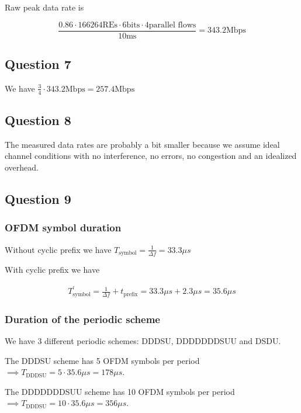 \documentclass[]{article}
\begin{document}
	Raw peak data rate is
	
	\begin{equation}
		\frac{0.86 \cdot 166264 \text{REs} \cdot 6 \text{bits} \cdot 4 \text{parallel flows}}{10 \text{ms}} = 343.2 \text{Mbps}
	\end{equation}
	
	\subsection*{Question 7}
	
	We have $\frac{3}{4} \cdot 343.2 \text{Mbps} = 257.4 \text{Mbps}$
	
	\subsection*{Question 8}
	
	The measured data rates are probably a bit smaller because we assume ideal channel conditions with no interference, no errors, no congestion and an idealized overhead.
	
	\subsection*{Question 9}
	
	\subsubsection*{OFDM symbol duration}
	
	Without cyclic prefix we have $T_{\text{symbol}} = \frac{1}{\Delta f} = 33.3 \mu s$
	
	With cyclic prefix we have
	
	\begin{align}
		T_{\text{symbol}}^\prime = \frac{1}{\Delta f} + t_{\text{prefix}} = 33.3\mu s + 2.3\mu s = 35.6 \mu s
	\end{align}
	
	\subsubsection*{Duration of the periodic scheme}
	
	We have 3 different periodic schemes: DDDSU, DDDDDDDSUU and DSDU.
	
	The DDDSU scheme has 5 OFDM symbols per period $\implies T_{\text{DDDSU}} = 5 \cdot 35.6 \mu s = 178 \mu s$.
	
	The DDDDDDDSUU scheme has 10 OFDM symbols per period $\implies T_{\text{DDDSU}} = 10 \cdot 35.6 \mu s = 356 \mu s$.
	
\end{document}

